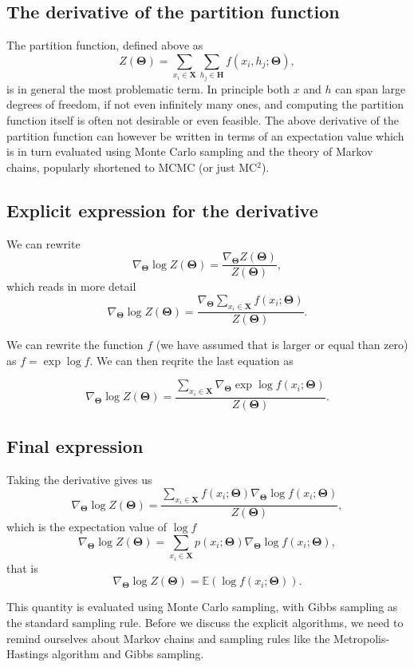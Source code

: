 \documentclass[%
oneside,                 %
final,                   %
10pt]{article}
\begin{document}
\subsection{The derivative of the partition function}

The partition function, defined above as
\[
Z(\bm{\Theta})=\sum_{x_i\in \bm{X}}\sum_{h_j\in \bm{H}} f(x_i,h_j;\bm{\Theta}),
\]
is in general the most problematic term. In principle both $x$ and $h$ can span large degrees of freedom, if not even infinitely many ones, and computing the partition function itself is often not desirable or even feasible. The above derivative of the partition function can however be written in terms of an expectation value which is in turn evaluated  using Monte Carlo sampling and the theory of Markov chains, popularly shortened to MCMC (or just MC$^2$).

\subsection{Explicit expression for the derivative}
We can rewrite
\[
\nabla_{\bm{\Theta}}\log{Z(\bm{\Theta})}=\frac{\nabla_{\bm{\Theta}}Z(\bm{\Theta})}{Z(\bm{\Theta})},
\]
which reads in more detail
\[
\nabla_{\bm{\Theta}}\log{Z(\bm{\Theta})}=\frac{\nabla_{\bm{\Theta}} \sum_{x_i\in \bm{X}}f(x_i;\bm{\Theta})   }{Z(\bm{\Theta})}.
\]

We can rewrite the function $f$ (we have assumed that is larger or
equal than zero) as $f=\exp{\log{f}}$. We can then reqrite the last
equation as

\[
\nabla_{\bm{\Theta}}\log{Z(\bm{\Theta})}=\frac{ \sum_{x_i\in \bm{X}} \nabla_{\bm{\Theta}}\exp{\log{f(x_i;\bm{\Theta})}}   }{Z(\bm{\Theta})}.
\]

\subsection{Final expression}

Taking the derivative gives us
\[
\nabla_{\bm{\Theta}}\log{Z(\bm{\Theta})}=\frac{ \sum_{x_i\in \bm{X}}f(x_i;\bm{\Theta}) \nabla_{\bm{\Theta}}\log{f(x_i;\bm{\Theta})}   }{Z(\bm{\Theta})}, 
\]
which is the expectation value of $\log{f}$
\[
\nabla_{\bm{\Theta}}\log{Z(\bm{\Theta})}=\sum_{x_i\in \bm{X}}p(x_i;\bm{\Theta}) \nabla_{\bm{\Theta}}\log{f(x_i;\bm{\Theta})},
\]
that is
\[
\nabla_{\bm{\Theta}}\log{Z(\bm{\Theta})}=\mathbb{E}(\log{f(x_i;\bm{\Theta})}).
\]

This quantity is evaluated using Monte Carlo sampling, with Gibbs
sampling as the standard sampling rule.  Before we discuss the
explicit algorithms, we need to remind ourselves about Markov chains
and sampling rules like the Metropolis-Hastings algorithm and Gibbs
sampling.
\end{document}
